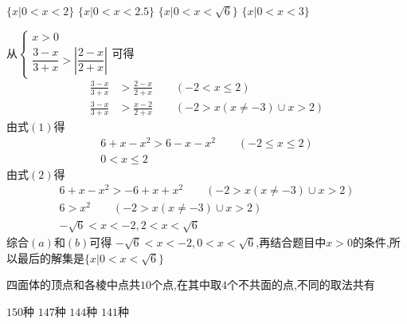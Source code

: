 \documentclass[answers]{exam}
\begin{document}
\begin{questions}
	\begin{oneparchoices}
		\choice $\{x|0< x < 2\}$
		\choice $\{x|0< x < 2.5\}$
		\CorrectChoice $\{x|0< x < \sqrt{6}\}$
		\choice $\{x|0< x < 3\}$
	\end{oneparchoices}

	\begin{solution}
		从\begin{math}
			\begin{cases}
				x> 0 \\
				\dfrac{3-x}{3+x} > \left|\dfrac{2-x}{2+x}\right|
			\end{cases}
		\end{math}可得
		\begin{align*}
			\frac{3-x}{3+x} & > \frac{2-x}{2+x} \qquad (-2 < x \leqslant 2) \tag{1}          \\
			\frac{3-x}{3+x} & > \frac{x-2}{2+x}  \qquad (-2 > x(x\neq-3) \cup x > 2) \tag{2}
		\end{align*}
		由式$(1)$得
		\begin{align*}
			6+x-x^2> 6-x -x^2 \qquad (-2 \leqslant x \leqslant 2) \\
			0 < x \leqslant 2 \tag{a}
		\end{align*}
		由式$(2)$得
		\begin{align*}
			6 +x - x^2 > -6 +x + x^2 \qquad (-2 > x(x\neq-3) \cup x > 2) \\
			6 > x^2 \qquad (-2 > x (x\neq-3) \cup x > 2)                 \\
			-\sqrt{6} < x < -2, 2 < x < \sqrt{6} \tag{b}
		\end{align*}
		综合$(a)$和$(b)$可得 $-\sqrt{6}<x < -2, 0< x <
			\sqrt{6}$,再结合题目中$x>0$的条件,所以最后的解集是$\{x|0<x<\sqrt{6}\}$
	\end{solution}

	\question 四面体的顶点和各棱中点共$10$个点,在其中取$4$个不共面的点,不同的取法共有 \hfs

	\begin{oneparchoices}
		\choice $150$种
		\choice $147$种
		\choice $144$种
		\CorrectChoice $141$种
	\end{oneparchoices}


\end{questions}
\end{document}
